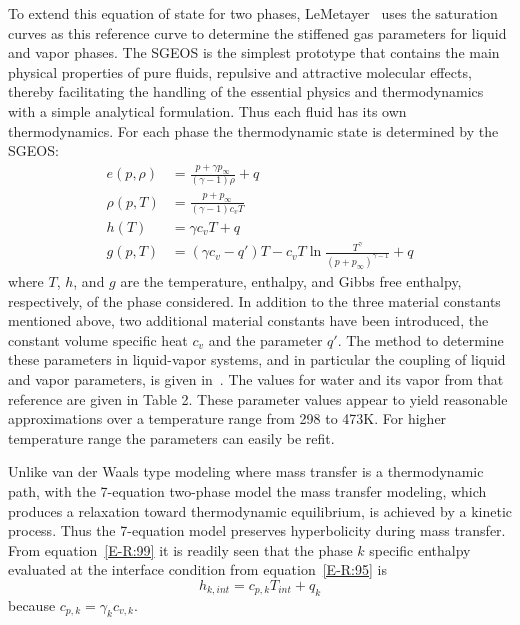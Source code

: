 To extend this equation of state for two phases,
LeMetayer~\cite{SGEOS} uses the saturation curves as this
reference curve to determine the stiffened gas parameters for liquid
and vapor phases.  The SGEOS is the simplest prototype that contains
the main physical properties of pure fluids, repulsive and attractive
molecular effects, thereby facilitating the handling of the essential
physics and thermodynamics with a simple analytical formulation.  Thus
each fluid has its own thermodynamics.  For each phase the
thermodynamic state is determined by the SGEOS:
\begin{align}
  \label{E-R:97}
  e(p,\rho) &= \frac{p+\gamma p_{\infty}}{(\gamma -1) \rho} + q
  \\
  \label{E-R:98}
  \rho (p,T) &= \frac{p+p_{\infty}}{(\gamma -1) c_v T}
  \\
  \label{E-R:99}
  h(T) &= \gamma  c_v T + q
  \\
  \label{E-R:100}
  g(p,T) &= \left(\gamma c_v - q'\right) T - c_v T \ln \frac{T^\gamma}{\left(p+p_{\infty}\right)^{\gamma-1}} + q
\end{align}
where $T$, $h$, and $g$ are the temperature, enthalpy,
and Gibbs free enthalpy, respectively, of the phase considered.  In
addition to the three material constants mentioned above, two
additional material constants have been introduced, the constant
volume specific heat $c_v$ and the parameter $q'$.  The method to
determine these parameters in liquid-vapor systems, and in particular
the coupling of liquid and vapor parameters, is given
in~\cite{SGEOS}.  The values for water and its vapor from that
reference are given in Table 2.  These parameter values appear to
yield reasonable approximations over a temperature range from 298 to
473K.  For higher temperature range the parameters can easily be
refit.

Unlike van der Waals type modeling where mass transfer is a
thermodynamic path, with the 7-equation two-phase model the mass
transfer modeling, which produces a relaxation toward thermodynamic
equilibrium, is achieved by a kinetic process.  Thus the 7-equation
model preserves hyperbolicity during mass transfer.
From equation~\eqref{E-R:99} it is readily seen that the phase
$k$ specific enthalpy evaluated at the interface condition from
equation~\eqref{E-R:95} is
\begin{equation}
  h_{k,  int} = c_{p, k}  T_{int} + q_k
\end{equation}
because $c_{p, k} = \gamma_k  c_{v, k}$.

